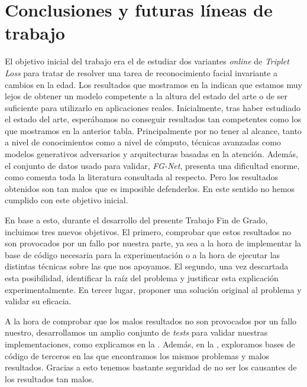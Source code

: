 \chapter{Conclusiones y futuras líneas de trabajo} \label{ich:conclusiones}

El objetivo inicial del trabajo era el de estudiar dos variantes \textit{online} de \textit{Triplet Loss} para tratar de resolver una tarea de reconocimiento facial invariante a cambios en la edad. Los resultados que mostramos en la  indican que estamos muy lejos de obtener un modelo competente a la altura del estado del arte o de ser suficiente para utilizarlo en aplicaciones reales. Inicialmente, tras haber estudiado el estado del arte, esperábamos no conseguir resultados tan competentes como los que mostramos en la anterior tabla. Principalmente por no tener al alcance, tanto a nivel de conocimientos como a nivel de cómputo, técnicas avanzadas como modelos generativos adversarios y arquitecturas basadas en la atención. Además, el conjunto de datos usado para validar, \textit{FG-Net}, presenta una dificultad enorme, como comenta toda la literatura consultada al respecto. Pero los resultados obtenidos son tan malos que es imposible defenderlos. En este sentido no hemos cumplido con este objetivo inicial.

En base a esto, durante el desarrollo del presente Trabajo Fin de Grado, incluimos tres nuevos objetivos. El primero, comprobar que estos resultados no son provocados por un fallo por nuestra parte, ya sea a la hora de implementar la base de código necesaria para la experimentación o a la hora de ejecutar las distintas técnicas sobre las que nos apoyamos. El segundo, una vez descartada esta posibilidad, identificar la raíz del problema y justificar esta explicación experimentalmente. En tercer lugar, proponer una solución original al problema y validar su eficacia.

A la hora de comprobar que los malos resultados no son provocados por un fallo nuestro, desarrollamos un amplio conjunto de \textit{tests} para validar nuestras implementaciones, como explicamos en la . Además, en la , exploramos bases de código de terceros en las que encontramos los mismos problemas y malos resultados. Gracias a esto tenemos bastante seguridad de no ser los causantes de los resultados tan malos.

